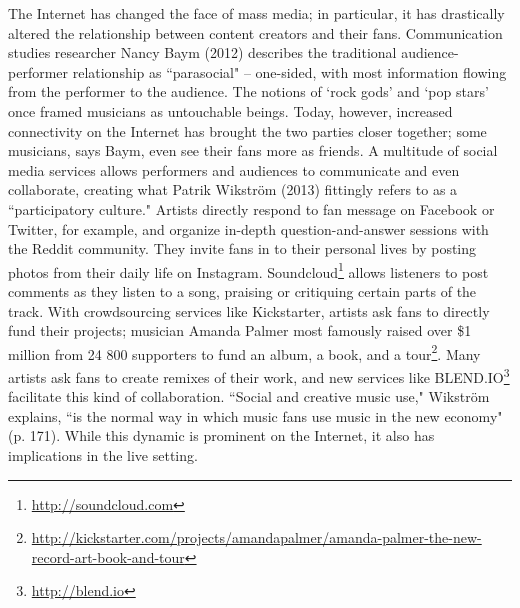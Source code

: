 The Internet has changed the face of mass media; in particular, it has drastically altered the relationship between content creators and their fans. Communication studies researcher Nancy Baym (2012) describes the traditional audience-performer relationship as ``parasocial" -- one-sided, with most information flowing from the performer to the audience. The notions of `rock gods' and `pop stars' once framed musicians as untouchable beings. Today, however, increased connectivity on the Internet has brought the two parties closer together; some musicians, says Baym, even see their fans more as friends. A multitude of social media services allows performers and audiences to communicate and even collaborate, creating what Patrik Wikstr\"{o}m (2013) fittingly refers to as a ``participatory culture." Artists directly respond to fan message on Facebook or Twitter, for example, and organize in-depth question-and-answer sessions with the Reddit community. They invite fans in to their personal lives by posting photos from their daily life on Instagram. Soundcloud\footnote{\url{http://soundcloud.com}} allows listeners to post comments as they listen to a song, praising or critiquing certain parts of the track. With crowdsourcing services like Kickstarter, artists ask fans to directly fund their projects; musician Amanda Palmer most famously raised over \$1 million from 24 800 supporters to fund an album, a book, and a tour\footnote{\url{http://kickstarter.com/projects/amandapalmer/amanda-palmer-the-new-record-art-book-and-tour}}. Many artists ask fans to create remixes of their work, and new services like BLEND.IO\footnote{\url{http://blend.io}} facilitate this kind of collaboration. ``Social and creative music use," Wikstr\"{o}m explains, ``is the normal way in which music fans use music in the new economy" (p. 171). While this dynamic is prominent on the Internet, it also has implications in the live setting.

